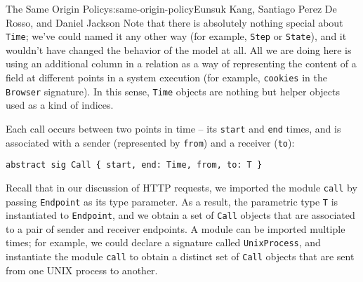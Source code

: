 \begin{aosachapter}{The Same Origin Policy}{s:same-origin-policy}{Eunsuk Kang, Santiago Perez De Rosso, and Daniel Jackson}
Note that there is absolutely nothing special about \texttt{Time}; we've
could named it any other way (for example, \texttt{Step} or
\texttt{State}), and it wouldn't have changed the behavior of the model
at all. All we are doing here is using an additional column in a
relation as a way of representing the content of a field at different
points in a system execution (for example, \texttt{cookies} in the
\texttt{Browser} signature). In this sense, \texttt{Time} objects are
nothing but helper objects used as a kind of indices.

Each call occurs between two points in time -- its \texttt{start} and
\texttt{end} times, and is associated with a sender (represented by
\texttt{from}) and a receiver (\texttt{to}):

\begin{verbatim}
abstract sig Call { start, end: Time, from, to: T } 
\end{verbatim}

Recall that in our discussion of HTTP requests, we imported the module
\texttt{call} by passing \texttt{Endpoint} as its type parameter. As a
result, the parametric type \texttt{T} is instantiated to
\texttt{Endpoint}, and we obtain a set of \texttt{Call} objects that are
associated to a pair of sender and receiver endpoints. A module can be
imported multiple times; for example, we could declare a signature
called \texttt{UnixProcess}, and instantiate the module \texttt{call} to
obtain a distinct set of \texttt{Call} objects that are sent from one
UNIX process to another.

\end{aosachapter}
